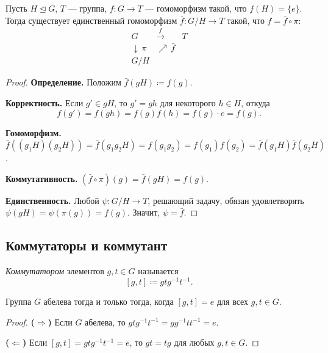 \begin{stmt}
    Пусть $H \trianglelefteq G$, $T$ --- группа, $f\colon G \to T$ --- гомоморфизм такой, что $f(H) = \{e\}$.
    Тогда существует единственный гомоморфизм $\bar{f}\colon G/H \to T$ такой, что $f = \bar{f} \circ \pi$:
    \[
        \begin{array}{ccc}
            G & \xrightarrow{\ f\ } & T \\
            \downarrow\, \pi & \nearrow\, \bar{f} & \\
            G/H & &
        \end{array}
    \]

    \begin{proof}
        \textbf{Определение.} Положим $\bar{f}(gH) \coloneqq f(g)$.

        \textbf{Корректность.} Если $g' \in gH$, то $g' = gh$ для некоторого $h \in H$, откуда
        \[
            f(g') = f(gh) = f(g) f(h) = f(g) \cdot e = f(g).
        \]

        \textbf{Гомоморфизм.} $\bar{f}((g_1 H)(g_2 H)) = \bar{f}(g_1 g_2 H) = f(g_1 g_2) = f(g_1) f(g_2) = \bar{f}(g_1 H)\bar{f}(g_2 H)$.

        \textbf{Коммутативность.} $(\bar{f} \circ \pi)(g) = \bar{f}(gH) = f(g)$.

        \textbf{Единственность.} Любой $\psi\colon G/H \to T$, решающий задачу, обязан удовлетворять $\psi(gH) = \psi(\pi(g)) = f(g)$. Значит, $\psi = \bar{f}$.
    \end{proof}
\end{stmt}

\subsection*{Коммутаторы и коммутант}

\begin{definition}
    \emph{Коммутатором} элементов $g, t \in G$ называется
    \[
        [g, t] \coloneqq g t g^{-1} t^{-1}.
    \]
\end{definition}

\begin{stmt}
    Группа $G$ абелева тогда и только тогда, когда $[g, t] = e$ для всех $g, t \in G$.

    \begin{proof}
        \textbf{($\Rightarrow$)} Если $G$ абелева, то $gtg^{-1}t^{-1} = gg^{-1}tt^{-1} = e$.

        \textbf{($\Leftarrow$)} Если $[g, t] = gtg^{-1}t^{-1} = e$, то $gt = tg$ для любых $g, t \in G$.
    \end{proof}
\end{stmt}

